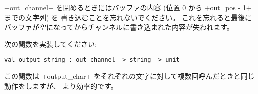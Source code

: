 \ml+out_channel+ を閉めるときにはバッファの内容 (位置 0 から \ml+out_pos - 1+ までの文字列) を
書き込むことを忘れないでください。
これを忘れると最後にバッファが空になってからチャンネルに書き込まれた内容が失われます。

\begin{exercise}
次の関数を実装してください:
%
\begin{lstlisting}
val output_string : out_channel -> string -> unit
\end{lstlisting}
%
この関数は \ml+output_char+ をそれぞれの文字に対して複数回呼んだときと同じ動作をしますが、
より効率的です。
\enlargethispage{2\baselineskip} %
\end{exercise}
